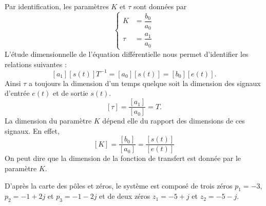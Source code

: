 Par identification, les paramètres $K$ et $\tau$ sont données par 
\[
    \begin{cases}
        K&=\dfrac{b_0}{a_0}\\[1.5em]
     \tau&=\dfrac{a_1}{a_0}
    \end{cases}
\]
L'étude dimensionnelle de l'équation différentielle nous permet d'identifier
les relations suivantes :
\[
    [a_1][s(t)] T^{-1} = [a_0][s(t)] = [b_0][e(t)].
\]
Ainsi $\tau$ a toujours la dimension d'un temps quelque soit la dimension des 
signaux d'entrée  $e(t)$ et de sortie $s(t)$.
\[
    [\tau] = \dfrac{[a_1]}{[a_0]}= T.
\]
La dimension du paramètre $K$ dépend elle du rapport des dimensions de ces 
signaux. En effet,
\[
    [K]=\dfrac{[b_0]}{[a_0]}=\dfrac{[s(t)]}{[e(t)]}
\]
On peut dire que la dimension de la fonction de transfert est donnée par 
le paramètre $K$.

D'après la carte des pôles et zéros, le système est composé de trois zéros
$p_1=-3$, $p_2=-1+2j$ et $p_3=-1-2j$ et de deux zéros $z_1=-5+j$ et $z_2=-5-j$.

